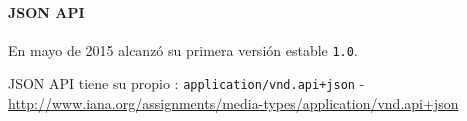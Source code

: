 \paragraph{JSON API}
\label{soa:tecnologias:json-api}







En mayo de 2015 alcanzó su primera versión estable \texttt{1.0}.

JSON API tiene su propio : \texttt{application/vnd.api+json} -  \url{http://www.iana.org/assignments/media-types/application/vnd.api+json}

